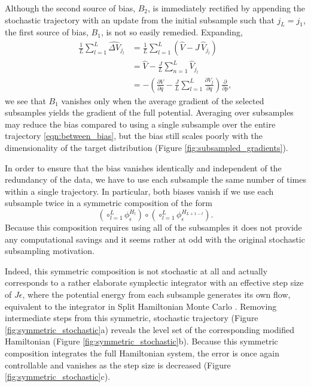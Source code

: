 \documentclass{article}
\begin{document}
Although the second source of bias, $B_{2}$, is immediately rectified by appending the 
stochastic trajectory with an update from the initial subsample such that $j_{L} = j_{1}$, 
the first source of bias, $B_{1}$, is not so easily remedied.  Expanding,
%
\begin{align*}
\frac{1}{L} \sum_{l = 1}^{L}  \widehat{ \Delta V}_{j_{l}}
&=
\frac{1}{L} \sum_{l = 1}^{L} \left( \hat{V} - J \, \hat{V}_{j_{l}} \right)
\\
&=
\hat{V} - \frac{J}{L} \sum_{n = 1}^{L} \hat{V}_{j_{l}}
\\
&=
- \left( \frac{ \partial V }{ \partial q }  - \frac{J}{L} \sum_{l = 1}^{L} \frac{ \partial V_{j} }{ \partial q }
\right) \frac{ \partial }{ \partial p },
\end{align*}
%
we see that $B_{1}$ vanishes only when the average gradient of the selected 
subsamples yields the gradient of the full potential.  Averaging over subsamples 
may reduce the bias compared to using a single subsample over the entire
trajectory \eqref{eqn:between_bias}, but the bias still scales poorly with the 
dimensionality of the target distribution (Figure \ref{fig:subsampled_gradients}).

In order to ensure that the bias vanishes identically and independent of the redundancy
of the data, we have to use each subsample the same number of times within a single 
trajectory.  In particular, both biases vanish if we use each subsample twice in a symmetric 
composition of the form
%
\begin{equation*}
\left( \circ_{l = 1}^{L} \phi^{H_{l}}_{\epsilon} \right)
\circ 
\left( \circ_{l = 1}^{L} \phi^{H_{L + 1 - l}}_{\epsilon} \right).
\end{equation*}
%
Because this composition requires using all of the subsamples it does not provide
any computational savings and it seems rather at odd with the original stochastic 
subsampling motivation. 

Indeed, this symmetric composition is not stochastic at all and actually corresponds 
to a rather elaborate symplectic integrator with an effective step size of $J \epsilon$, 
where the potential energy from each subsample generates its own flow, equivalent
to the integrator in Split Hamiltonian Monte Carlo \cite{ShahbabaEtAl:2014}.  Removing 
intermediate steps from this symmetric, stochastic trajectory 
(Figure \ref{fig:symmetric_stochastic}a) reveals the level set of the corresponding
modified Hamiltonian (Figure \ref{fig:symmetric_stochastic}b).  Because this
symmetric composition integrates the full Hamiltonian system, the error is 
once again controllable and vanishes as the step size is decreased
(Figure \ref{fig:symmetric_stochastic}c).
\end{document}
